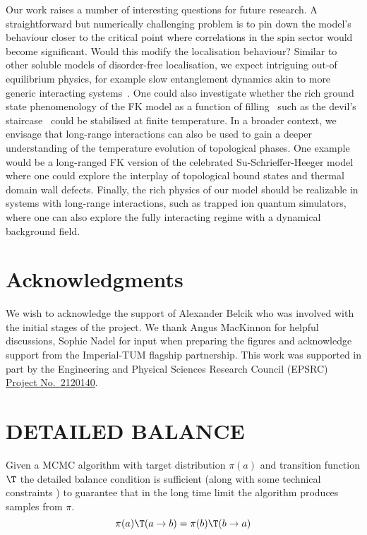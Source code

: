 Our work raises a number of interesting questions for future research. 
A straightforward but numerically challenging problem is to pin down the model's behaviour closer to the critical point where correlations in the spin sector would become significant. Would this modify the localisation behaviour? Similar to other soluble models of disorder-free localisation, we expect intriguing out-of equilibrium physics, for example slow entanglement dynamics akin to more generic interacting systems~\cite{hartLogarithmicEntanglementGrowth2020}. One could also investigate whether the rich ground state phenomenology of the FK model as a function of filling~\cite{gruberGroundStatesSpinless1990} such as the devil's staircase~\cite{michelettiCompleteDevilTextquotesingles1997} could be stabilised at finite temperature. In a broader context, we envisage that long-range interactions can also be used to gain a deeper understanding of the temperature evolution of topological phases. One example would be a long-ranged \ac{FK} version of the celebrated Su-Schrieffer-Heeger model where one could explore the interplay of topological bound states and thermal domain wall defects. Finally, the rich physics of our model should be realizable in systems with long-range interactions, such as trapped ion quantum simulators, where one can also explore the fully interacting regime with a dynamical background field.  

\section{Acknowledgments}
We wish to acknowledge the support of Alexander Belcik who was involved with the initial stages of the project. We thank Angus MacKinnon for helpful discussions, Sophie Nadel for input when preparing the figures and acknowledge support from the Imperial-TUM flagship partnership. This work was supported in part by the Engineering and Physical Sciences Research Council (EPSRC)  \href{https://gtr.ukri.org/project/145404DD-ABAD-4CFB-A2D8-152A6AFCCEB7#/tabOverview}{Project No.~2120140}.


\appendix

\section{\label{app:balance}
DETAILED BALANCE
}
Given a \ac{MCMC} algorithm with target distribution \(\pi(a)\) and transition function \(\T\) the detailed balance condition is sufficient (along with some technical constraints \cite{wolffMonteCarloErrors2004}) to guarantee that in the long time limit the algorithm produces samples from \(\pi\). 
\[\pi(a)\T(a \to b) = \pi(b)\T(b \to a)\]

